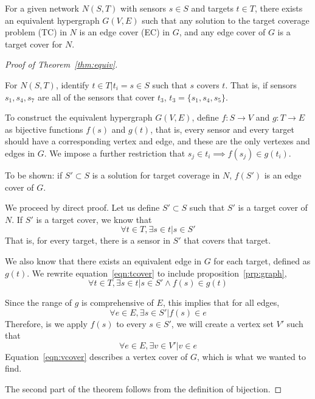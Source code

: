 \begin{thm}
  For a given network $N(S,T)$ with sensors $s\in S$ and targets $t\in T$, there exists an equivalent hypergraph $G(V,E)$ such that any solution to the target coverage problem (TC) in $N$ is an edge cover (EC) in $G$, and any edge cover of $G$ is a target cover for $N$.
\label{thm:equiv}
\end{thm}
\begin{proof}[Proof of Theorem~\ref{thm:equiv}]
\begin{prop}
For $N(S,T)$, identify $t \in T | t_i = s \in S $ such that $s$ covers $t$. That is, if sensors $s_1, s_4, s_7$ are all of the sensors that cover $t_3$, $t_3 = \{s_1, s_4, s_5\}$. \label{prp:network}
\end{prop}
\begin{prop}To construct the equivalent hypergraph $G(V,E)$, define $f:S\to V$ and $g:T\to E$ as bijective functions $f(s)$ and $g(t)$, that is, every sensor and every target should have a corresponding vertex and edge, and these are the only vertexes and edges in $G$. We impose a further restriction that $ s_j \in t_i \implies f(s_j) \in g(t_i)$. 
\label{prp:graph}
\end{prop}

To be shown: if $S' \subset S$ is a solution for target coverage in $N$, $f(S')$ is an edge cover of $G$. 

We proceed by direct proof. Let us define $S'\subset S$ such that $S'$ is a target cover of $N$. If $S'$ is a target cover, we know that 
\begin{equation}
\forall t \in T, \exists s \in t | s \in S'
\label{eqn:tcover}
\end{equation}
That is, for every target, there is a sensor in $S'$ that covers that target.

We also know that there exists an equivalent edge in $G$ for each target, defined as $g(t)$. We rewrite equation~\ref{eqn:tcover} to include proposition~\ref{prp:graph},
\begin{equation}
\forall t \in T, \exists s \in t | s \in S' \land f(s) \in g(t)
\label{eqn:extcover}
\end{equation}

Since the range of $g$ is comprehensive of $E$, this implies that for all edges,
\begin{equation}
\forall e \in E, \exists s \in S' | f(s) \in e
\end{equation}
Therefore, is we apply $f(s)$ to every $s \in S'$, we will create a vertex set $V'$ such that
\begin{equation}
\forall e \in E, \exists v \in V' | v \in e
\label{eqn:vcover}
\end{equation}
Equation~\ref{eqn:vcover} describes a vertex cover of $G$, which is what we wanted to find.

The second part of the theorem follows from the definition of bijection. 
\end{proof}